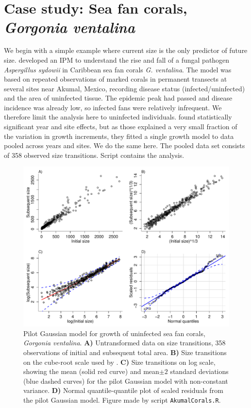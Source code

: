 \documentclass[12pt]{article}
\begin{document}
\section{Case study: Sea fan corals, \emph{Gorgonia ventalina}}
We begin with a simple example where current size is the only predictor of future size. \cite{bruno-etal-2011} developed
an IPM to understand the rise and fall of a fungal pathogen \emph{Aspergillus sydowii} in Caribbean sea fan corals 
\emph{G. ventalina}. The model was based on repeated observations of marked corals in permanent transects at several sites 
near Akumal, Mexico, recording disease status (infected/uninfected) and the area of uninfected tissue. 
The epidemic peak had passed and disease incidence was already low, so infected fans were relatively infrequent. 
We therefore limit the analysis here to uninfected individuals. \citet{bruno-et-al-2011} found statistically significant year
and site effects, but as those explained a very small fraction of the variation in growth increments, they fitted a single growth
model to data pooled across years and sites. We do the same here. The pooled data set consists of 358 observed
size transitions. Script  contains the analysis. 

\begin{figure}[tbp]
\centering
\includegraphics[width=\textwidth]{figures/AkumalPilot.pdf}
\caption{Pilot Gaussian model for growth of uninfected sea fan corals, \emph{Gorgonia ventalina}. \textbf{A)} Untransformed
data on size transitions, 358 observations of initial and subsequent total area. 
\textbf{B)} Size transitions on the cube-root scale used by \citet{bruno-etal-2011}. 
\textbf{C)} Size transitions on log scale, showing the mean (solid red curve) and mean$\pm 2$ standard deviations (blue dashed
curves) for the pilot Gaussian model with non-constant variance. \textbf{D)} Normal quantile-quantile plot of scaled residuals
from the pilot Gaussian model. Figure made by script \texttt{AkumalCorals.R}.}
\label{fig:AkumalPilot}
\end{figure} 
\end{document}
